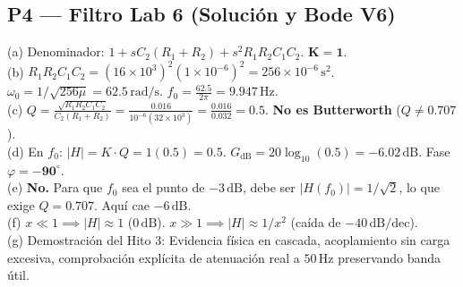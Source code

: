 \documentclass[10pt, a4paper]{article}
\begin{document}
\subsection*{P4 — Filtro Lab 6 (Solución y Bode V6)}
(a) Denominador: $1 + s C_2(R_1+R_2) + s^2 R_1 R_2 C_1 C_2$. $\mathbf{K = 1}$. \\
(b) $R_1 R_2 C_1 C_2 = (16\times 10^3)^2(1\times 10^{-6})^2 = 256\times 10^{-6}\,\mathrm{s}^2$. $\omega_0 = 1/\sqrt{256\mu} = \mathbf{62.5\,\mathrm{rad/s}}$. $f_0 = \frac{62.5}{2\pi} = \mathbf{9.947\,\mathrm{Hz}}$. \\
(c) $Q = \frac{\sqrt{R_1 R_2 C_1 C_2}}{C_2(R_1+R_2)} = \frac{0.016}{10^{-6}(32\times 10^3)} = \frac{0.016}{0.032} = \mathbf{0.5}$. \textbf{No es Butterworth} ($Q \neq 0.707$). \\
(d) En $f_0$: $|H| = K \cdot Q = 1(0.5) = \mathbf{0.5}$. $G_{\mathrm{dB}} = 20\log_{10}(0.5) = \mathbf{-6.02\,\mathrm{dB}}$. Fase $\varphi = \mathbf{-90^\circ}$. \\
(e) \textbf{No.} Para que $f_0$ sea el punto de $-3\,\mathrm{dB}$, debe ser $|H(f_0)| = 1/\sqrt{2}$, lo que exige $Q=0.707$. Aquí cae $-6\,\mathrm{dB}$. \\
(f) $x \ll 1 \implies |H| \approx 1$ ($0\,\mathrm{dB}$). $x \gg 1 \implies |H| \approx 1/x^2$ (caída de $-40\,\mathrm{dB/dec}$). \\
(g) Demostración del Hito 3: Evidencia física en cascada, acoplamiento sin carga excesiva, comprobación explícita de atenuación real a $50\,\mathrm{Hz}$ preservando banda útil.
\begin{center}
\end{center}
\end{document}
